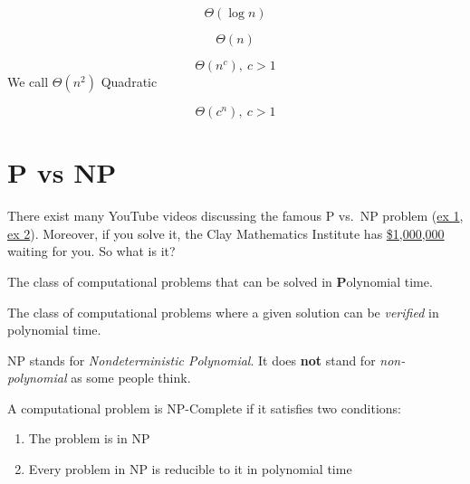 \documentclass[main.tex]{subfiles}
\begin{document}
\begin{defn}[Logarithmic]
	\[\Theta(\log n)\]
\end{defn}

\begin{defn}[Linear]
	\[\Theta(n)\]
\end{defn}

\begin{defn}[Polynomial]
	\[\Theta(n^c),\ c > 1\]
	We call \(\Theta(n^2)\) Quadratic
\end{defn}

\begin{defn}[Exponential]
	\[\Theta(c^n),\ c > 1\]
\end{defn}

\section{P vs NP}

There exist many YouTube videos discussing the famous P vs.\ NP problem (\href{https://www.youtube.com/watch?v=EHp4FPyajKQ}{ex 1}, \href{https://www.youtube.com/watch?v=YX40hbAHx3s}{ex 2}). Moreover, if you solve it, the Clay Mathematics Institute has \href{https://www.claymath.org/millennium-problems/p-vs-np-problem}{\$1,000,000} waiting for you. So what is it?

\begin{defn}[P]
	The class of computational problems that can be solved in \textbf{P}olynomial time.
\end{defn}

\begin{defn}[NP]
	The class of computational problems where a given solution can be \textit{verified} in polynomial time.
\end{defn}

\begin{rem}
	NP stands for \textit{Nondeterministic Polynomial}. It does \textbf{not} stand for \textit{non-polynomial} as some people think.
\end{rem}



\begin{defn}[Reductions]
	
\end{defn}

\begin{defn}[NP-Complete]
	A computational problem is NP-Complete if it satisfies two conditions:
	\begin{enumerate}
		\item The problem is in NP
		\item Every problem in NP is reducible to it in polynomial time
	\end{enumerate}
\end{defn}
\end{document}
